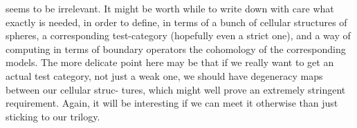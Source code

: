 
seems to be irrelevant.  It might be worth while to write down with care
what exactly is needed,  in order to define,  in terms of a bunch of
cellular structures\xout{,} of spheres,  a corresponding test-category (hopefully
even a strict one),  and a way of computing in terms of boundary operators
the cohomology of the corresponding models.  The more delicate point here
may be that if we really want to get an actual test category,  not just a
 weak one,  we should have  degeneracy maps between our cellular struc-%
tures,  which might well prove an extremely stringent requirement.  Again,
it will be interesting if we can meet it otherwise than just sticking to
our trilogy.

